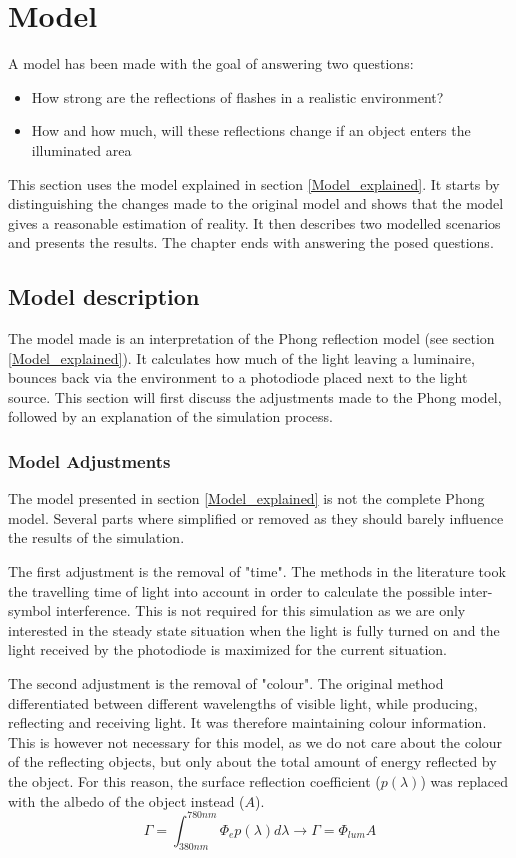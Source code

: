 \chapter{Model}
\label{Model}

A model has been made with the goal of answering two questions:
\begin{itemize}[itemsep=-1ex,topsep=0pt]
	\item How strong are the reflections of flashes in a realistic environment?
	\item How and how much, will these reflections change if an object enters the illuminated area
\end{itemize}
This section uses the model explained in section \ref{Model_explained}. It starts by distinguishing the changes made to the original model \cite{Advances_In_Optical_Communication} and shows that the model gives a reasonable estimation of reality. It then describes two modelled scenarios and presents the results. The chapter ends with answering the posed questions.

\section{Model description}
The model made is an interpretation of the Phong reflection model (see section \ref{Model_explained}). It calculates how much of the light leaving a luminaire, bounces back via the environment to a photodiode placed next to the light source. This section will first discuss the adjustments made to the Phong model, followed by an explanation of the simulation process.

\subsection{Model Adjustments}
The model presented in section \ref{Model_explained} is not the complete Phong model. Several parts where simplified or removed as they should barely influence the results of the simulation.

The first adjustment is the removal of "time". The methods in the literature took the travelling time of light into account in order to calculate the possible inter-symbol interference. This is not required for this simulation as we are only interested in the steady state situation when the light is fully turned on and the light received by the photodiode is maximized for the current situation.

The second adjustment is the removal of "colour". The original method differentiated between different wavelengths of visible light, while producing, reflecting and receiving light. It was therefore maintaining colour information. This is however not necessary for this model, as we do not care about the colour of the reflecting objects, but only about the total amount of energy reflected by the object. For this reason, the surface reflection coefficient ($p(\lambda)$) was replaced with the albedo of the object instead ($A$).
\begin{equation}
\label{Model_simp_2}
\Gamma = \int_{380nm}^{780nm} \Phi_e p(\lambda) d\lambda \to \Gamma = \Phi_{lum} A
\end{equation}

